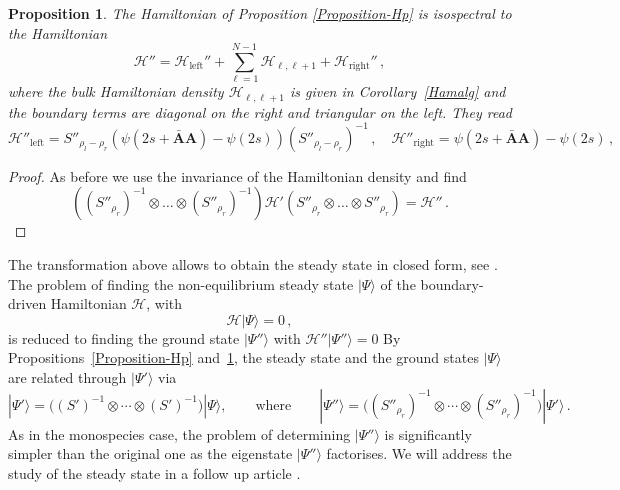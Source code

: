 \documentclass[11pt]{article}
\numberwithin{equation}{section}
\newtheorem{proposition}[theorem]{Proposition}
\newcommand{\OF}{\mathbf{A}}
\newcommand{\OFD}{\mathbf{\bar{A}}}
\newcommand{\N}{N}
\newcommand{\eH}{\mathcal{H}}
\begin{document}
\begin{proposition}\label{Proposition-Hs}
The Hamiltonian of Proposition \eqref{Proposition-Hp} is isospectral to the Hamiltonian
\begin{equation}
  \eH'' = \mathcal{H}_\text{left}'' + \sum_{\ell=1}^{\N-1}\mathcal{H}_{\ell,\ell+1} + \mathcal{H}_\text{right}''\,,
\end{equation}
where the bulk Hamiltonian density $\mathcal{H}_{\ell,\ell+1}$ is given in Corollary~\ref{Hamalg} and the boundary terms are diagonal on the right and triangular on the left. They read
\begin{equation}\label{right-left-BD-hamiltonian-II}
 \mathcal{H}''_{\text{left}} = S''_{\rho_{l}-\rho_{r}}\left(\psi(2s+\OFD\OF)-\psi(2s)\right)( S''_{\rho_{l}-\rho_{r}})^{-1}\,,\quad  \mathcal{H}''_{\text{right}} = \psi(2s+\OFD\OF)-\psi(2s)\,,
\end{equation}
\end{proposition}
\begin{proof}
   As before we use the invariance of the Hamiltonian density and find 
    \begin{equation}
      (  (S''_{\rho_{r}})^{-1}\otimes\ldots\otimes (S''_{\rho_{r}})^{-1})\mathcal{H}'(S''_{\rho_{r}}\otimes\ldots\otimes S''_{\rho_{r}})=\mathcal{H}''\,.
    \end{equation}    
\end{proof}
The transformation above allows to obtain the steady state in closed form, see \cite{Frassek:2019imp,Frassek:2020omo}. The problem of finding  the non-equilibrium steady state  $|\Psi\rangle$  of the boundary-driven Hamiltonian $\eH$, with
\begin{equation}
    \eH|\Psi\rangle =0\,,
\end{equation}
is reduced to finding the ground state $|\Psi''\rangle$ with $\eH''|\Psi''\rangle =0$ 
By Propositions~\ref{Proposition-Hp} and~\ref{Proposition-Hs}, the steady state and the ground states $|\Psi\rangle$ are related through $|\Psi'\rangle$ via
\begin{equation}
    |\Psi'\rangle= \big((S')^{-1}\otimes \cdots \otimes (S')^{-1}\big)|\Psi\rangle,
    \qquad
    \text{where}\qquad{
    |\Psi''\rangle =\big((S''_{\rho_r})^{-1}\otimes \cdots \otimes (S''_{\rho_r})^{-1}\big)|\Psi'\rangle \,.}
\end{equation}
As in the monospecies case, the  problem of determining $|\Psi''\rangle$ is significantly simpler than the original one as the eigenstate $|\Psi''\rangle$ factorises. We will address the study of the steady state in a follow up article \cite{toap}.
\end{document}
